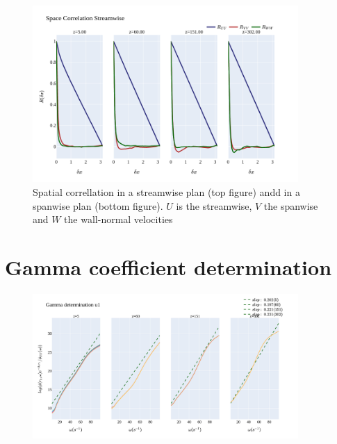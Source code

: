 \documentclass[]{article}
\theoremstyle{plain}
\theoremstyle{remark}
\begin{document}
\begin{figure}[h!]
	\begin{center}
		\includegraphics[width=0.9\textwidth]{../output/split_time/space_correlation/streamwise.png}
		\caption{Spatial correllation in a streamwise plan (top figure) andd in a spanwise plan (bottom figure). $U$ is the streamwise, $V$ the spanwise and $W$ the wall-normal velocities}
	\end{center}
\end{figure}


\section*{Gamma coefficient determination}

\begin{figure}[h!]
	\begin{center}
		\includegraphics[width=0.9\textwidth]{../output/split_time/gamma/gamma_u1.png}
	\end{center}
\end{figure}
\end{document}
